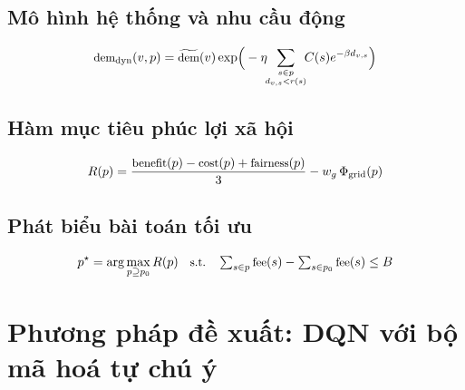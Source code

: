 \documentclass[10pt, conference, a4paper, compsocconf]{IEEEtran}
\begin{document}
\subsection{Mô hình hệ thống và nhu cầu động}
\begin{equation}\small
\label{eq:demand}
\text{dem}_{\text{dyn}}(v,p) = \widetilde{\text{dem}}(v)\exp\!\Big(-\eta\!\!\sum_{\substack{s\in p\\ d_{v,s}<r(s)}}\!\! C(s)e^{-\beta d_{v,s}}\Big)
\end{equation}

\subsection{Hàm mục tiêu phúc lợi xã hội}
\begin{equation}\small
\label{eq:score}
R(p) = \frac{\text{benefit}(p) - \text{cost}(p) + \text{fairness}(p)}{3} - w_g\,\Phi_{\text{grid}}(p)
\end{equation}

\subsection{Phát biểu bài toán tối ưu}
\begin{equation}\small
\label{eq:opt}
p^{\star} = \arg\max_{p\supseteq p_0} R(p) \quad\text{s.t.}\quad \textstyle\sum_{s\in p}\text{fee}(s) - \sum_{s\in p_0}\text{fee}(s) \le B
\end{equation}

\section{Phương pháp đề xuất: DQN với bộ mã hoá tự chú ý}
\label{sec:method}
\end{document}
